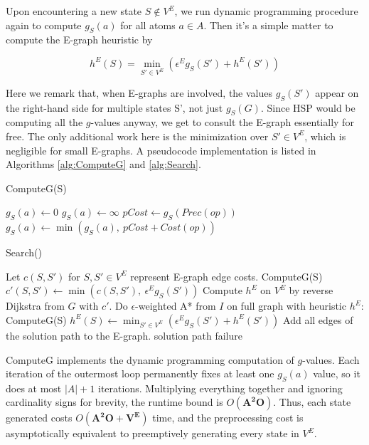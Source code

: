 \documentclass[letterpaper]{article}
\begin{document}
Upon encountering a new state $S\notin V^E$, we run dynamic programming procedure again to compute $g_S(a)$ for all atoms $a\in A$. Then it's a simple matter to compute the E-graph heuristic by

\[h^E(S) = \min_{S'\in V^E} \left( \epsilon^E g_S(S') + h^E(S') \right)\]

Here we remark that, when E-graphs are involved, the values $g_S(S')$ appear on the right-hand side for multiple states S', not just $g_S(G)$. Since HSP would be computing all the $g$-values anyway, we get to consult the E-graph essentially for free. The only additional work here is the minimization over $S'\in V^E$, which is negligible for small E-graphs. A pseudocode implementation is listed in Algorithms \ref{alg:ComputeG} and \ref{alg:Search}.

\begin{algorithm}
\caption{ComputeG(S)}
\label{alg:ComputeG}
\begin{algorithmic}
\STATE $g_S(a) \leftarrow 0$
\ELSE
\STATE $g_S(a) \leftarrow \infty$
\ENDIF
\ENDFOR
\REPEAT
{}
\STATE $pCost \leftarrow g_S(Prec(op))$
\STATE $g_S(a) \leftarrow \min \left(g_S(a),~pCost + Cost(op)\right)$
\ENDFOR
\ENDFOR
{}
\end{algorithmic}
\end{algorithm}

\begin{algorithm}
\caption{Search()}
\label{alg:Search}
\begin{algorithmic}
\STATE Let $c(S,S')$ for $S,S'\in V^E$ represent E-graph edge costs.
\STATE ComputeG(S)
\STATE $c'(S,S') \leftarrow \min\left(c(S,S'),~\epsilon^E g_S(S')\right)$
\ENDFOR
\ENDFOR
\STATE Compute $h^E$ on $V^E$ by reverse Dijkstra from $G$ with $c'$.
\STATE Do $\epsilon$-weighted A* from $I$ on full graph with heuristic $h^E$:
\STATE ComputeG(S)
\STATE $h^E(S) \leftarrow \min_{S'\in V^E} \left( \epsilon^E g_S(S') + h^E(S') \right)$
\ENDFOR
{}
\STATE Add all edges of the solution path to the E-graph.
\RETURN solution path
\ELSE
\RETURN failure
\ENDIF
\end{algorithmic}
\end{algorithm}

ComputeG implements the dynamic programming computation of $g$-values. Each iteration of the outermost loop permanently fixes at least one $g_S(a)$ value, so it does at most $|A|+1$ iterations. Multiplying everything together and ignoring cardinality signs for brevity, the runtime bound is $O(\mathbf{A^2O})$. Thus, each state generated costs $O(\mathbf{A^2O + V^E})$ time, and the preprocessing cost is asymptotically equivalent to preemptively generating every state in $V^E$.
\end{document}
